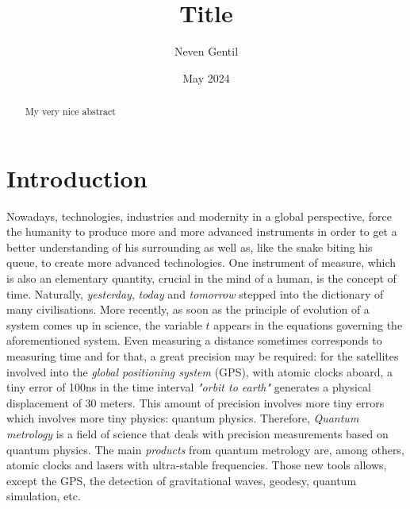 \documentclass[10pt]{report}
\begin{document}
\title{Title}
\author{Neven Gentil}
\date{May 2024}
\maketitle

\begin{abstract}
My very nice abstract
\end{abstract}

\chapter{Introduction}

Nowadays, technologies, industries and modernity in a global perspective, force the humanity to produce more and more advanced instruments in order to get a better understanding of his surrounding as well as, like the snake biting his queue, to create more advanced technologies. One instrument of measure, which is also an elementary quantity, crucial in the mind of a human, is the concept of time. Naturally, \textit{yesterday}, \textit{today} and \textit{tomorrow} stepped into the dictionary of many civilisations. More recently, as soon as the principle of evolution of a system comes up in science, the variable $t$ appears in the equations governing the aforementioned system. Even measuring a distance sometimes corresponds to measuring time and for that, a great precision may be required: for the satellites involved into the \textit{global positioning system} (GPS), with atomic clocks aboard, a tiny error of 100ns in the time interval \textit{"orbit to earth"} generates a physical displacement of 30 meters. This amount of precision involves more tiny errors which involves more tiny physics: quantum physics. Therefore, \textit{Quantum metrology} is a field of science that deals with precision measurements based on quantum physics. The main \textit{products} from quantum metrology are, among others, atomic clocks and lasers with ultra-stable frequencies. Those new tools allows, except the GPS, the detection of gravitational waves, geodesy, quantum simulation, etc. 
\end{document}
